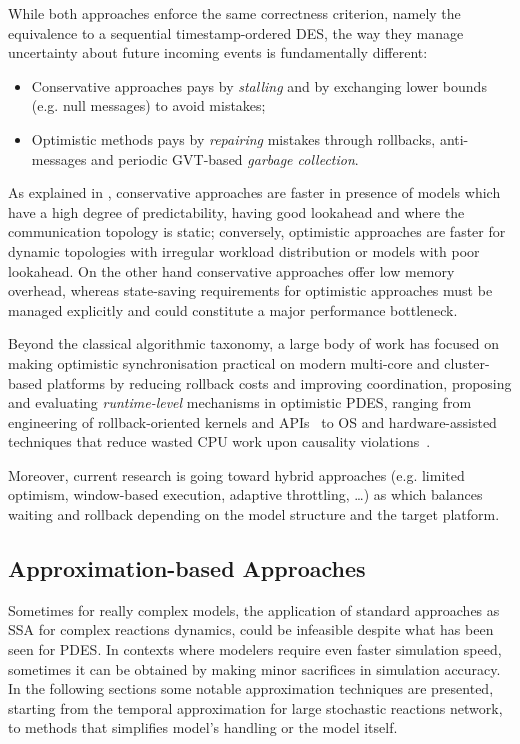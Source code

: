 While both approaches enforce the same correctness criterion, namely the
equivalence to a sequential timestamp-ordered \ac{DES}, the way they manage
uncertainty about future incoming events is fundamentally different:
\begin{itemize}
	\item Conservative approaches pays by \emph{stalling} and by exchanging
	      lower bounds (e.g. null messages) to avoid mistakes;
	\item Optimistic methods pays by \emph{repairing} mistakes through
	      rollbacks, anti-messages and periodic \ac{GVT}-based \emph{garbage
		      collection}.
\end{itemize}
As explained in \cite{Fujimoto1990PDES}, conservative approaches are faster in
presence of models which have a high degree of predictability, having good
lookahead and where the communication topology is static; conversely,
optimistic approaches are faster for dynamic topologies with irregular workload
distribution or models with poor lookahead. On the other hand conservative
approaches offer low memory overhead, whereas state-saving requirements for
optimistic approaches must be managed explicitly and could constitute a major
performance bottleneck.

Beyond the classical algorithmic taxonomy, a large body of work has focused on
making optimistic synchronisation practical on modern multi-core and
cluster-based platforms by reducing rollback costs and improving coordination,
proposing and evaluating \emph{runtime-level} mechanisms in optimistic
\ac{PDES}, ranging from engineering of rollback-oriented kernels and
APIs~\cite{pellegrini2012TROSCIPM} to OS and hardware-assisted techniques that
reduce wasted CPU work upon causality violations~\cite{silvestri2020IPI}.

Moreover, current research is going toward hybrid approaches (e.g. limited
optimism, window-based execution, adaptive throttling, \dots) as
\cite{piccione2023HSSPDES} which balances waiting and rollback depending on the
model structure and the target platform.

\subsection{Approximation-based Approaches}

Sometimes for really complex models, the application of standard approaches as
\ac{SSA} for complex reactions dynamics, could be infeasible despite what has
been seen for \ac{PDES}. In contexts where modelers require even faster
simulation speed, sometimes it can be obtained by making minor sacrifices in
simulation accuracy. In the following sections some notable approximation
techniques are presented, starting from the temporal approximation for large
stochastic reactions network, to methods that simplifies model's handling or
the model itself.

